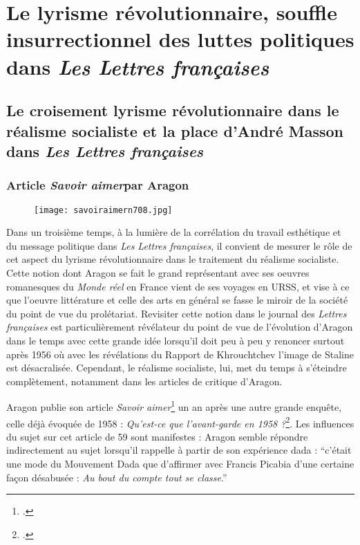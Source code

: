 \chapter{Le lyrisme révolutionnaire, souffle insurrectionnel des luttes politiques dans \emph{Les Lettres françaises} }

\section{Le croisement lyrisme révolutionnaire dans le réalisme socialiste et la place d’André Masson dans \emph{Les Lettres françaises}}

\subsection{Article \emph{Savoir aimer}par Aragon}
 
 \begin{figure}[H]
   \centering
   \texttt{[image: savoiraimern708.jpg]}
	\caption{\cite{savoiraimer}}\label{fig:Savoiraimer}
\end{figure}


Dans un troisième temps, à la lumière de la corrélation du travail esthétique et du message politique dans \emph{Les Lettres françaises}, il convient de mesurer le rôle de cet aspect du lyrisme révolutionnaire dans le traitement du réalisme socialiste. Cette notion dont Aragon se fait le grand représentant avec ses oeuvres romanesques du \emph{Monde réel} en France vient de ses voyages en URSS, et vise à ce que l’oeuvre littérature et celle des arts en général se fasse le miroir de la société du point de vue du prolétariat. Revisiter cette notion dans le journal des \emph{Lettres françaises} est particulièrement révélateur du point de vue de l’évolution d’Aragon dans le temps avec cette grande idée lorsqu’il doit peu à peu y renoncer surtout après 1956 où avec les révélations du Rapport de Khrouchtchev l’image de Staline est désacralisée. Cependant, le réalisme socialiste, lui, met du temps à s’éteindre complètement, notamment dans les articles de critique d’Aragon. 

	 Aragon publie son article \emph{Savoir aimer}\footcite{savoiraimer} un an après une autre grande enquête, celle déjà évoquée de 1958 : \emph{Qu’est-ce que l’avant-garde en 1958 ?}\footcite{avantgarde}. Les influences du sujet sur cet article de 59 sont manifestes : Aragon semble répondre indirectement au sujet lorsqu’il rappelle à partir de son expérience dada : \enquote{c’était une mode du Mouvement Dada que d’affirmer avec Francis Picabia d’une certaine façon désabusée : \emph{Au bout du compte tout se classe}.}



